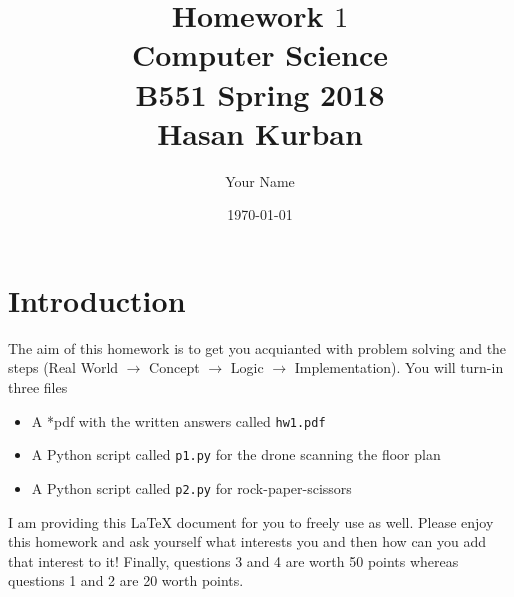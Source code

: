 \documentclass{article}
\begin{document}
\title{Homework $1$\\ Computer Science \\ B551 Spring 2018\\ Hasan Kurban}         %
\author{Your Name}        %
\date{\today}          %
\maketitle


\makeatother     %




\pagestyle{plain}
\section*{Introduction}
The aim of this homework is to get you acquianted with problem solving and the steps  (Real World $\rightarrow$ Concept $\rightarrow$ Logic  $\rightarrow$ Implementation).  You will turn-in three files\begin{itemize} \item A *pdf with the written answers called \texttt{hw1.pdf} \item A Python script called \texttt{p1.py} for the drone scanning the floor plan \item  A Python script called  \texttt{p2.py} for rock-paper-scissors \end{itemize}  I am providing this \LaTeX{} document for you to freely use as well. Please enjoy this homework and ask yourself what interests you and then how can you add that interest to it!  Finally,  questions 3  and 4  are worth 50 points whereas questions 1 and 2 are 20  worth points.
\newpage
\end{document}
